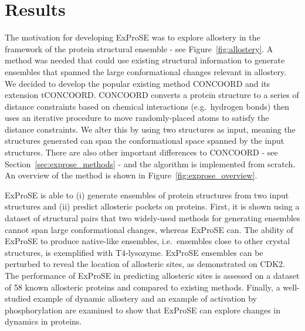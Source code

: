 \section{Results}
\label{sec:exprose_results}

The motivation for developing ExProSE was to explore allostery in the framework of the protein structural ensemble - see Figure~\ref{fig:allostery}.
A method was needed that could use existing structural information to generate ensembles that spanned the large conformational changes relevant in allostery.
We decided to develop the popular existing method CONCOORD and its extension tCONCOORD.
CONCOORD converts a protein structure to a series of distance constraints based on chemical interactions (e.g.\ hydrogen bonds) then uses an iterative procedure to move randomly-placed atoms to satisfy the distance constraints.
We alter this by using two structures as input, meaning the structures generated can span the conformational space spanned by the input structures.
There are also other important differences to CONCOORD - see Section~\ref{sec:exprose_methods} - and the algorithm is implemented from scratch.
An overview of the method is shown in Figure~\ref{fig:exprose_overview}.

ExProSE is able to (i) generate ensembles of protein structures from two input structures and (ii) predict allosteric pockets on proteins.
First, it is shown using a dataset of structural pairs that two widely-used methods for generating ensembles cannot span large conformational changes, whereas ExProSE can.
The ability of ExProSE to produce native-like ensembles, i.e.\ ensembles close to other crystal structures, is exemplified with T4-lysozyme.
ExProSE ensembles can be perturbed to reveal the location of allosteric sites, as demonstrated on CDK2.
The performance of ExProSE in predicting allosteric sites is assessed on a dataset of 58 known allosteric proteins and compared to existing methods.
Finally, a well-studied example of dynamic allostery and an example of activation by phosphorylation are examined to show that ExProSE can explore changes in dynamics in proteins.


